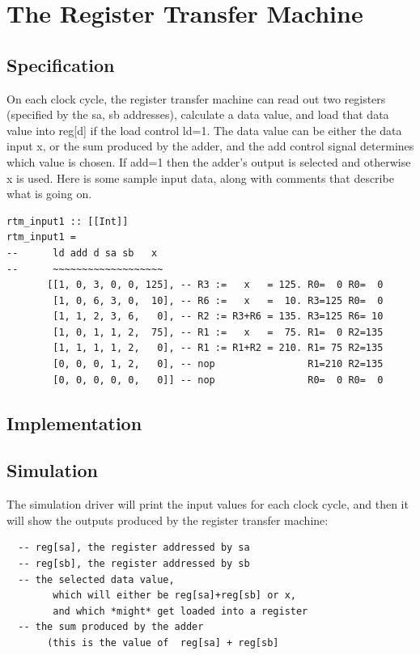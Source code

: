 \documentclass[a4paper,openany,fleqn]{book}
\begin{document}
\section{The Register Transfer Machine}
\label{sec:RTM}

\subsection{Specification}
\label{sec:RTM-specification}

On each clock cycle, the register transfer machine can read out two
registers (specified by the sa, sb addresses), calculate a data value,
and load that data value into reg[d] if the load control ld=1.  The
data value can be either the data input x, or the sum produced by the
adder, and the add control signal determines which value is chosen.
If add=1 then the adder's output is selected and otherwise x is used.
Here is some sample input data, along with comments that describe what
is going on.

\begin{verbatim}
rtm_input1 :: [[Int]]
rtm_input1 =
--      ld add d sa sb   x
--      ~~~~~~~~~~~~~~~~~~~
       [[1, 0, 3, 0, 0, 125], -- R3 :=   x   = 125. R0=  0 R0=  0
        [1, 0, 6, 3, 0,  10], -- R6 :=   x   =  10. R3=125 R0=  0
        [1, 1, 2, 3, 6,   0], -- R2 := R3+R6 = 135. R3=125 R6= 10
        [1, 0, 1, 1, 2,  75], -- R1 :=   x   =  75. R1=  0 R2=135
        [1, 1, 1, 1, 2,   0], -- R1 := R1+R2 = 210. R1= 75 R2=135
        [0, 0, 0, 1, 2,   0], -- nop                R1=210 R2=135
        [0, 0, 0, 0, 0,   0]] -- nop                R0=  0 R0=  0
\end{verbatim}

\subsection{Implementation}
\label{sec:RTM-implementation}

\subsection{Simulation}
\label{sec:RTM-simulation}

The simulation driver will print the input values for each clock
cycle, and then it will show the outputs produced by the register
transfer machine:
\begin{verbatim}
  -- reg[sa], the register addressed by sa
  -- reg[sb], the register addressed by sb
  -- the selected data value,
        which will either be reg[sa]+reg[sb] or x,
        and which *might* get loaded into a register
  -- the sum produced by the adder
       (this is the value of  reg[sa] + reg[sb]
\end{verbatim}
\end{document}
